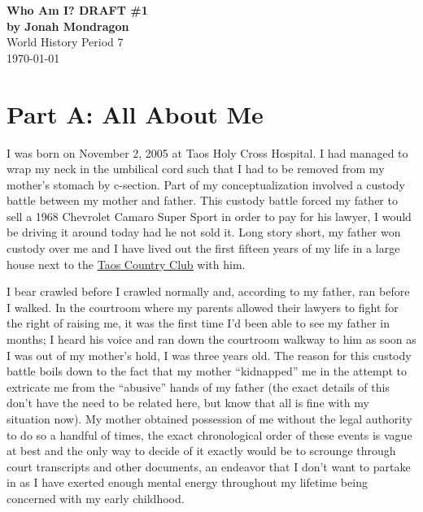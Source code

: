 \documentclass[12pt]{article}
\begin{document}
\doublespacing

\begin{titlepage}
    \begin{center}
        \vspace*{1.5in}
        {\huge\bfseries{Who Am I? DRAFT \#1}}\\
            {\bfseries{by Jonah Mondragon}}\\
            World History Period 7\\
            \today
    \end{center}
\end{titlepage}

\section*{Part A: All About Me}

I was born on November 2, 2005 at Taos Holy Cross Hospital.
I had managed to wrap my neck in the umbilical cord such that I had to be removed from my 
    mother's stomach by c-section.
Part of my conceptualization involved a custody battle between my mother and father.
This custody battle forced my father to sell a 1968 Chevrolet Camaro Super Sport
    in order to pay for his lawyer, I would be driving it around today had he not sold it.
Long story short, my father won custody over me and I have lived out the first fifteen years of my 
    life in a large house next to the {\color{blue}\underline{\href{https://www.taoscountryclub.com/}{Taos Country Club}}} with him.

I bear crawled before I crawled normally and, according to my father, ran before I walked.
In the courtroom where my parents allowed their lawyers to fight for the right of raising me,
    it was the first time I'd been able to see my father in months; %
    I heard his voice and ran down the courtroom walkway to him as soon as I was out of 
    my mother's hold, I was three years old. %
The reason for this custody battle boils down to the fact that my mother  ``kidnapped'' me in the
    attempt to extricate me from the ``abusive'' hands of my father (the exact details of this don't
    have the need to be related here, but know that all is fine with my situation now).
My mother obtained possession of me without the legal authority to do so a handful of times, the
    exact chronological order of these events is vague at best and the only way to decide of it
    exactly would be to scrounge through court transcripts and other documents, an endeavor
    that I don't want to partake in as I have exerted enough mental energy throughout my lifetime
    being concerned with my early childhood.
\end{document}
